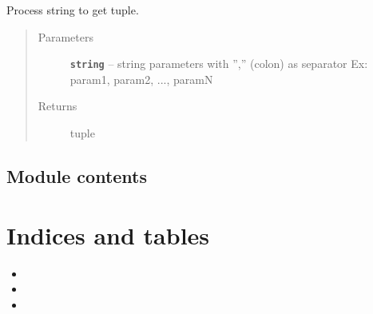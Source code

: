 \documentclass[letterpaper,10pt,english]{sphinxmanual}
\begin{document}

\begin{fulllineitems}
\label{RRtoolbox:RRtoolbox.shell.tuple_creator}
Process string to get tuple.
\begin{quote}\begin{description}
\item[{Parameters}] \leavevmode
\textbf{\texttt{string}} -- string parameters with '','' (colon) as separator
Ex: param1, param2, ..., paramN

\item[{Returns}] \leavevmode
tuple

\end{description}\end{quote}

\end{fulllineitems}



\section{Module contents}
\label{RRtoolbox:module-RRtoolbox}\label{RRtoolbox:module-contents}

\chapter{Indices and tables}
\label{index:indices-and-tables}\begin{itemize}
\item {} 

\item {} 

\item {} 

\end{itemize}
\end{document}
